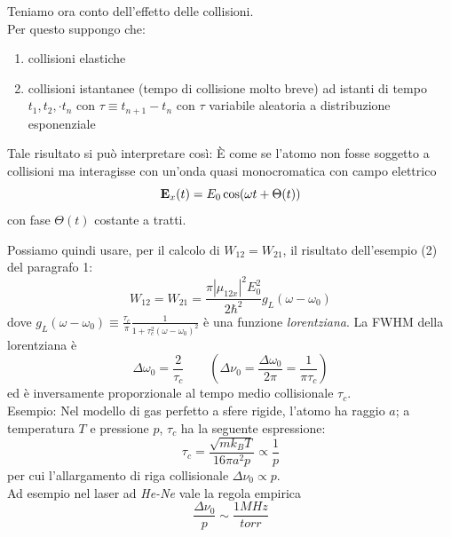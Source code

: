Teniamo ora conto dell'effetto delle collisioni.\\
Per questo suppongo che:
\begin{enumerate}
\item collisioni elastiche
\item collisioni istantanee (tempo di collisione molto breve) ad istanti di tempo $t_1, t_2, \cdot t_n$ con $\tau \equiv t_{n+1} - t_n$ con $\tau$ variabile aleatoria a distribuzione esponenziale
\end{enumerate}





Tale risultato si può interpretare così: È come se l'atomo non fosse soggetto a collisioni ma interagisse con un'onda quasi monocromatica con campo elettrico
\begin{equation*}
\mathbf{E}_x(t) = E_0 \cos(\omega t + \Theta(t))
\end{equation*}
con fase $\Theta(t)$ costante a tratti.

Possiamo quindi usare, per il calcolo di $W_{12} = W_{21}$, il risultato dell'esempio (2) del paragrafo 1:
\begin{equation*}
W_{12} = W_{21} = \frac{\pi|\mu_{12x}|^2 E_0^2}{2\hbar^2} g_L(\omega - \omega_0)
\end{equation*}
dove $g_L(\omega - \omega_0) \equiv \frac{\tau_c}{\pi} \frac{1}{1+ \tau_c^2(\omega - \omega_0)^2}$ è una funzione \textit{lorentziana}.
La FWHM della lorentziana è
\begin{equation*}
\Delta \omega_0 = \frac{2}{\tau_c} \qquad \left(\Delta \nu_0 = \frac{\Delta \omega_0}{2\pi} = \frac{1}{\pi \tau_c} \right)
\end{equation*}
ed è inversamente proporzionale al tempo medio collisionale $\tau_c$.\\
Esempio: Nel modello di gas perfetto a sfere rigide, l'atomo ha raggio $a$; a temperatura $T$ e pressione $p$, $\tau_c$ ha la seguente espressione:
\begin{equation*}
\tau_c = \frac{\sqrt{m k_B T}}{16 \pi a^2 p} \propto \frac{1}{p}
\end{equation*}
per cui l'allargamento di riga collisionale $\Delta \nu_0 \propto p$.\\
Ad esempio nel laser ad \textit{He-Ne} vale la regola empirica
\begin{equation*}
\frac{\Delta \nu_0}{p} \sim \frac{1 MHz}{torr}
\end{equation*}

